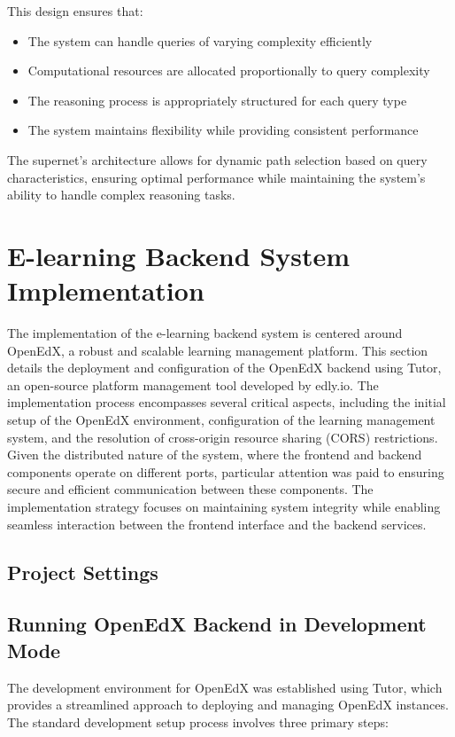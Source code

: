 \documentclass[../Main.tex]{subfiles}
\begin{document}
This design ensures that:
\begin{itemize}
    \item The system can handle queries of varying complexity efficiently
    \item Computational resources are allocated proportionally to query complexity
    \item The reasoning process is appropriately structured for each query type
    \item The system maintains flexibility while providing consistent performance
\end{itemize}

The supernet's architecture allows for dynamic path selection based on query characteristics, ensuring optimal performance while maintaining the system's ability to handle complex reasoning tasks.


\section{E-learning Backend System Implementation}
\label{section:5.2_e_learning_backend}

The implementation of the e-learning backend system is centered around OpenEdX, a robust and scalable learning management platform. This section details the deployment and configuration of the OpenEdX backend using Tutor, an open-source platform management tool developed by edly.io. The implementation process encompasses several critical aspects, including the initial setup of the OpenEdX environment, configuration of the learning management system, and the resolution of cross-origin resource sharing (CORS) restrictions. Given the distributed nature of the system, where the frontend and backend components operate on different ports, particular attention was paid to ensuring secure and efficient communication between these components. The implementation strategy focuses on maintaining system integrity while enabling seamless interaction between the frontend interface and the backend services.

\subsection{Project Settings}
\label{section:5.2.1_project_settings}

\subsection{Running OpenEdX Backend in Development Mode}
\label{section:5.2.2_running_openedx_backend_in_development_mode}
The development environment for OpenEdX was established using Tutor, which provides a streamlined approach to deploying and managing OpenEdX instances. The standard development setup process involves three primary steps:
\end{document}

